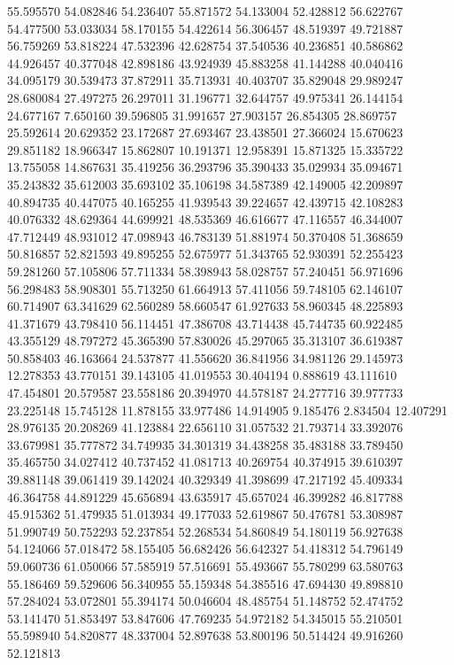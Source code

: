 55.595570
54.082846
54.236407
55.871572
54.133004
52.428812
56.622767
54.477500
53.033034
58.170155
54.422614
56.306457
48.519397
49.721887
56.759269
53.818224
47.532396
42.628754
37.540536
40.236851
40.586862
44.926457
40.377048
42.898186
43.924939
45.883258
41.144288
40.040416
34.095179
30.539473
37.872911
35.713931
40.403707
35.829048
29.989247
28.680084
27.497275
26.297011
31.196771
32.644757
49.975341
26.144154
24.677167
7.650160
39.596805
31.991657
27.903157
26.854305
28.869757
25.592614
20.629352
23.172687
27.693467
23.438501
27.366024
15.670623
29.851182
18.966347
15.862807
10.191371
12.958391
15.871325
15.335722
13.755058
14.867631
35.419256
36.293796
35.390433
35.029934
35.094671
35.243832
35.612003
35.693102
35.106198
34.587389
42.149005
42.209897
40.894735
40.447075
40.165255
41.939543
39.224657
42.439715
42.108283
40.076332
48.629364
44.699921
48.535369
46.616677
47.116557
46.344007
47.712449
48.931012
47.098943
46.783139
51.881974
50.370408
51.368659
50.816857
52.821593
49.895255
52.675977
51.343765
52.930391
52.255423
59.281260
57.105806
57.711334
58.398943
58.028757
57.240451
56.971696
56.298483
58.908301
55.713250
61.664913
57.411056
59.748105
62.146107
60.714907
63.341629
62.560289
58.660547
61.927633
58.960345
48.225893
41.371679
43.798410
56.114451
47.386708
43.714438
45.744735
60.922485
43.355129
48.797272
45.365390
57.830026
45.297065
35.313107
36.619387
50.858403
46.163664
24.537877
41.556620
36.841956
34.981126
29.145973
12.278353
43.770151
39.143105
41.019553
30.404194
0.888619
43.111610
47.454801
20.579587
23.558186
20.394970
44.578187
24.277716
39.977733
23.225148
15.745128
11.878155
33.977486
14.914905
9.185476
2.834504
12.407291
28.976135
20.208269
41.123884
22.656110
31.057532
21.793714
33.392076
33.679981
35.777872
34.749935
34.301319
34.438258
35.483188
33.789450
35.465750
34.027412
40.737452
41.081713
40.269754
40.374915
39.610397
39.881148
39.061419
39.142024
40.329349
41.398699
47.217192
45.409334
46.364758
44.891229
45.656894
43.635917
45.657024
46.399282
46.817788
45.915362
51.479935
51.013934
49.177033
52.619867
50.476781
53.308987
51.990749
50.752293
52.237854
52.268534
54.860849
54.180119
56.927638
54.124066
57.018472
58.155405
56.682426
56.642327
54.418312
54.796149
59.060736
61.050066
57.585919
57.516691
55.493667
55.780299
63.580763
55.186469
59.529606
56.340955
55.159348
54.385516
47.694430
49.898810
57.284024
53.072801
55.394174
50.046604
48.485754
51.148752
52.474752
53.141470
51.853497
53.847606
47.769235
54.972182
54.345015
55.210501
55.598940
54.820877
48.337004
52.897638
53.800196
50.514424
49.916260
52.121813
